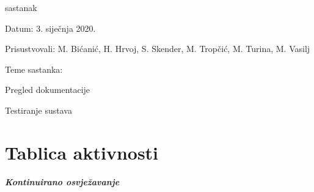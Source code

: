 \begin{packed_enum}
		
		\item  sastanak
		
			\item[] \begin{packed_item}
				\item Datum: 3. siječnja 2020.
				\item Prisustvovali: M. Bićanić, H. Hrvoj, S. Skender, M. Tropčić, M. Turina, M. Vasilj 
				\item Teme sastanka:
				\begin{packed_item}
					\item  Pregled dokumentacije
					\item  Testiranje sustava
				\end{packed_item}
			\end{packed_item}
			
		\end{packed_enum}
		
	\eject
		\section*{Tablica aktivnosti}
		
			\textbf{\textit{Kontinuirano osvježavanje}}\\
			
